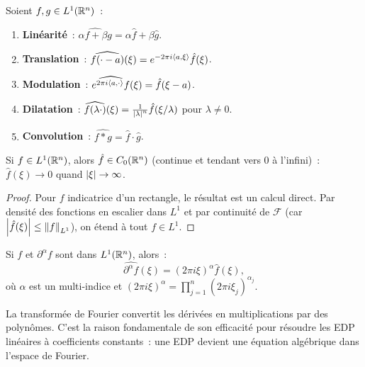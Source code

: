 \begin{proposition}
\label{prop:proprietes_fourier}
Soient $f, g \in L^1(\mathbb{R}^n)$~:
\begin{enumerate}
    \item \textbf{Lin\'earit\'e}~: $\widehat{\alpha f + \beta g} = \alpha \hat{f} + \beta \hat{g}$.
    \item \textbf{Translation}~: $\widehat{f(\cdot - a)}(\xi) = e^{-2\pi i \langle a, \xi \rangle} \hat{f}(\xi)$.
    \item \textbf{Modulation}~: $\widehat{e^{2\pi i \langle a, \cdot \rangle} f}(\xi) = \hat{f}(\xi - a)$.
    \item \textbf{Dilatation}~: $\widehat{f(\lambda \cdot)}(\xi) = \frac{1}{\left| \lambda \right|^n} \hat{f}(\xi/\lambda)$ pour $\lambda \neq 0$.
    \item \textbf{Convolution}~: $\widehat{f * g} = \hat{f} \cdot \hat{g}$.
\end{enumerate}
\end{proposition}

\begin{theoreme}
Si $f \in L^1(\mathbb{R}^n)$, alors $\hat{f} \in C_0(\mathbb{R}^n)$ (continue et tendant vers $0$
\`a l'infini)~: $\hat{f}(\xi) \to 0$ quand $\left| \xi \right| \to \infty$.
\end{theoreme}

\begin{proof}
Pour $f$ indicatrice d'un rectangle, le r\'esultat est un calcul direct. Par
densit\'e des fonctions en escalier dans $L^1$ et par continuit\'e de $\mathcal{F}$
(car $\left| \hat{f}(\xi) \right| \leq \left\| f \right\|_{L^1}$), on \'etend \`a tout $f \in L^1$.
\end{proof}

\begin{theoreme}
Si $f$ et $\partial^\alpha f$ sont dans $L^1(\mathbb{R}^n)$, alors~:
\[
    \widehat{\partial^\alpha f}(\xi) = (2\pi i \xi)^\alpha \hat{f}(\xi),
\]
o\`u $\alpha$ est un multi-indice et $(2\pi i \xi)^\alpha = \prod_{j=1}^{n}(2\pi i \xi_j)^{\alpha_j}$.
\end{theoreme}

\begin{intuition}
La transform\'ee de Fourier convertit les d\'eriv\'ees en multiplications par des
polyn\^omes. C'est la raison fondamentale de son efficacit\'e pour r\'esoudre les
EDP lin\'eaires \`a coefficients constants~: une EDP devient une \'equation
alg\'ebrique dans l'espace de Fourier.
\end{intuition}

